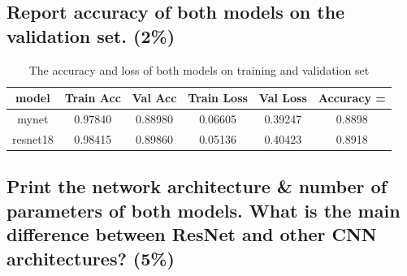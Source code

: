 \documentclass[a4paper, 12pt]{article}
\begin{document}
\subsection{Report accuracy of both models on the validation set. (2\%)}
\begin{table}[!htb]
    \centering
    \caption{The accuracy and loss of both models on training and validation set}
    \begin{tabular}{|c|c|c|c|c|c|}
        \hline
        model    & Train Acc & Val Acc & Train Loss & Val Loss & Accuracy = \\
        \hline
        mynet    & 0.97840   & 0.88980 & 0.06605    & 0.39247  & 0.8898     \\
        \hline
        resnet18 & 0.98415   & 0.89860 & 0.05136    & 0.40423  & 0.8918     \\
        \hline
    \end{tabular}
\end{table}

\subsection{Print the network architecture \& number of parameters of both models. What is the main difference between ResNet and other CNN architectures? (5\%)}
\end{document}
